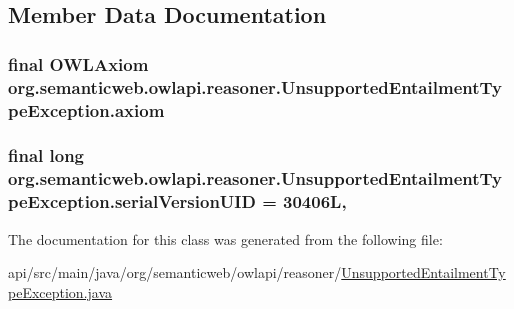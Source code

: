 \subsection{Member Data Documentation}
\hypertarget{classorg_1_1semanticweb_1_1owlapi_1_1reasoner_1_1_unsupported_entailment_type_exception_abcda02fe14216d9cfda036f8962b36b6}{
\subsubsection[{axiom}]{\setlength{\rightskip}{0pt plus 5cm}final {\bf O\-W\-L\-Axiom} org.\-semanticweb.\-owlapi.\-reasoner.\-Unsupported\-Entailment\-Type\-Exception.\-axiom\hspace{0.3cm}{\ttfamily [private]}}}\label{classorg_1_1semanticweb_1_1owlapi_1_1reasoner_1_1_unsupported_entailment_type_exception_abcda02fe14216d9cfda036f8962b36b6}
\hypertarget{classorg_1_1semanticweb_1_1owlapi_1_1reasoner_1_1_unsupported_entailment_type_exception_ace55f3ef5abde1735bffb24fa29e4a2e}{
\subsubsection[{serial\-Version\-U\-I\-D}]{\setlength{\rightskip}{0pt plus 5cm}final long org.\-semanticweb.\-owlapi.\-reasoner.\-Unsupported\-Entailment\-Type\-Exception.\-serial\-Version\-U\-I\-D = 30406\-L\hspace{0.3cm}{\ttfamily [static]}, {\ttfamily [private]}}}\label{classorg_1_1semanticweb_1_1owlapi_1_1reasoner_1_1_unsupported_entailment_type_exception_ace55f3ef5abde1735bffb24fa29e4a2e}


The documentation for this class was generated from the following file\-:\begin{DoxyCompactItemize}
\item 
api/src/main/java/org/semanticweb/owlapi/reasoner/\hyperlink{_unsupported_entailment_type_exception_8java}{Unsupported\-Entailment\-Type\-Exception.\-java}\end{DoxyCompactItemize}
